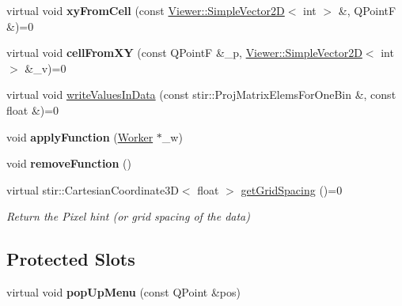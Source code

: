 \begin{DoxyCompactItemize}
\item 
\mbox{\label{classdisplay__screen_a8bef78ebe05dc6e7174b07dc41ba8e4c}} 
virtual void {\bfseries xy\+From\+Cell} (const \mbox{\hyperlink{classViewer_1_1SimpleVector2D}{Viewer\+::\+Simple\+Vector2D}}$<$ int $>$ \&, Q\+PointF \&)=0
\item 
\mbox{\label{classdisplay__screen_aeb43714b249ecf4bb5693e6551298d57}} 
virtual void {\bfseries cell\+From\+XY} (const Q\+PointF \&\+\_\+p, \mbox{\hyperlink{classViewer_1_1SimpleVector2D}{Viewer\+::\+Simple\+Vector2D}}$<$ int $>$ \&\+\_\+v)=0
\item 
virtual void \mbox{\hyperlink{classdisplay__screen_a2788f315d8f91b4c8a2b870698ce6623}{write\+Values\+In\+Data}} (const stir\+::\+Proj\+Matrix\+Elems\+For\+One\+Bin \&, const float \&)=0
\item 
\mbox{\label{classdisplay__screen_a17b159563b62a3c8bfd7245453ba421a}} 
void {\bfseries apply\+Function} (\mbox{\hyperlink{classWorker}{Worker}} $\ast$\+\_\+w)
\item 
\mbox{\label{classdisplay__screen_a2df277a3abd63d90ec1ead11d0eb3818}} 
void {\bfseries remove\+Function} ()
\item 
\mbox{\label{classdisplay__screen_addb4faa7ad8c8dd34de9543a01ecd4af}} 
virtual stir\+::\+Cartesian\+Coordinate3D$<$ float $>$ \mbox{\hyperlink{classdisplay__screen_addb4faa7ad8c8dd34de9543a01ecd4af}{get\+Grid\+Spacing}} ()=0
\begin{DoxyCompactList}\small\item\em Return the Pixel hint (or grid spacing of the data) \end{DoxyCompactList}\end{DoxyCompactItemize}
\subsection*{Protected Slots}
\begin{DoxyCompactItemize}
\item 
\mbox{\label{classdisplay__screen_a6312d4f51441872e8d9a677b5ae7584d}} 
virtual void {\bfseries pop\+Up\+Menu} (const Q\+Point \&pos)
\end{DoxyCompactItemize}
